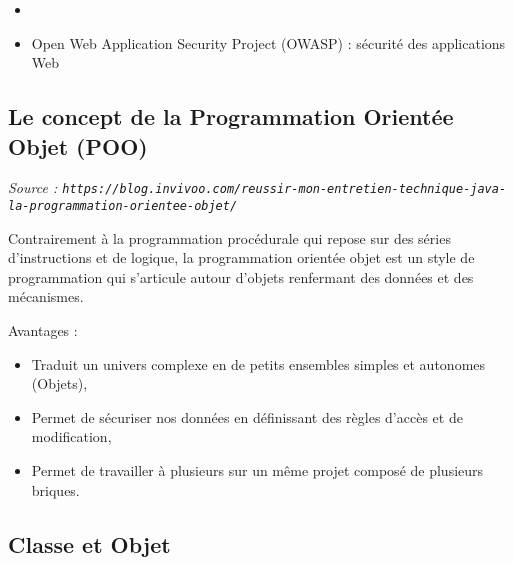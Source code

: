 \documentclass[11pt,twoside,a4paper]{article}
\begin{document}
\begin{landscape}
\begin{multicols}{2}
\begin{itemize}
\begin{itemize}
				\item 6 : correctifs...
				\item 7 : notation binaire, formatage num{\'e}rique, switch string, inf{\'e}rence types g{\'e}n{\'e}riques {\`a} la cr{\'e}ation, multicatch exceptions, java.nio (Files, Path...), autoboxing des primitifs...
				\item 8 : lambda, stream, interfaces fonctionnelles
				\item 9 : jigsaw (modularisation) ; kulla (JShell) ; JSON natif et http2
				\item 10 : inf{\'e}rence types "var", Graal / JIT plus rapide
				\item 11 : am{\'e}liorations lambda, surpression CORBA
		\end{itemize}
		\item[]
		\item Open Web Application Security Project (OWASP) : s{\'e}curit{\'e} des applications Web
	\end{itemize} %
	
	\vfill
	
	\columnbreak
	

\subsection*{Le concept de la Programmation Orient{\'e}e Objet (POO)}
\emph{\footnotesize Source : \texttt{https://blog.invivoo.com/reussir-mon-entretien-technique-java-la-programmation-orientee-objet/} }

Contrairement {\`a} la programmation proc{\'e}durale qui repose sur des s{\'e}ries d'instructions et de logique, la programmation orient{\'e}e objet est un style de programmation qui s'articule autour d'objets renfermant des donn{\'e}es et des m{\'e}canismes.

Avantages :
\begin{itemize}
	\item Traduit un univers complexe en de petits ensembles simples et autonomes (Objets),
    \item Permet de s{\'e}curiser nos donn{\'e}es en d{\'e}finissant des r{\`e}gles d'acc{\`e}s et de modification,
    \item Permet de travailler {\`a} plusieurs sur un m{\^e}me projet compos{\'e} de plusieurs briques.
\end{itemize}

\subsection*{Classe et Objet}

\end{multicols}
\end{landscape}
\end{document}
